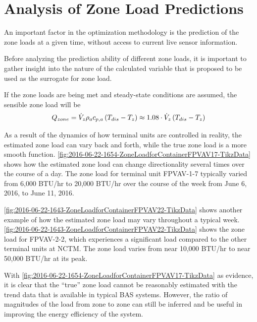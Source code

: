 \section{Analysis of Zone Load Predictions}

An important factor in the optimization methodology is the prediction of
the zone loads at a given time, without access to current live sensor
information. 

Before analyzing the prediction ability of different zone loads, it is
important to gather insight into the nature of the calculated variable
that is proposed to be used as the surrogate for zone load.   

If the zone loads are being met and steady-state conditions are assumed,
the sensible zone load will be
\begin{equation}
    Q_{zone}=\dot{V}_{z} \rho_a c_{p,a}{} \left(T_{dis}-T_{z} \right) \approx 1.08 \cdot \dot{V}_{z}\left(T_{dis}-T_{z} \right)
\end{equation}

As a result of the dynamics of how terminal units are controlled in reality,
the estimated zone load can vary back and forth, while the true zone load is a
more smooth function. \figref{}
\ref{fig:2016-06-22-1654-ZoneLoadforContainerFPVAV17-TikzData} shows how the
estimated zone load can change directionality several times over the course of
a day. The zone load for terminal unit FPVAV-1-7 typically varied from 6,000
BTU/hr to 20,000 BTU/hr over the course of the week from June 6, 2016, to June
11, 2016.

\figref{} \ref{fig:2016-06-22-1643-ZoneLoadforContainerFPVAV22-TikzData}
shows another example of how the estimated zone load may vary throughout
a typical week. \figref{}
\ref{fig:2016-06-22-1643-ZoneLoadforContainerFPVAV22-TikzData} shows the
zone load for FPVAV-2-2, which experiences a significant load compared
to the other terminal units at NCTM. The zone load varies from near
10,000 BTU/hr to near 50,000 BTU/hr at its peak.

With \figref{}
\ref{fig:2016-06-22-1654-ZoneLoadforContainerFPVAV17-TikzData} as
evidence, it is clear that the ``true'' zone load cannot be reasonably
estimated with the trend data that is available in typical BAS systems.
However, the ratio of magnitudes of the load from zone to zone can still
be inferred and be useful in improving the energy efficiency of the
system.  

